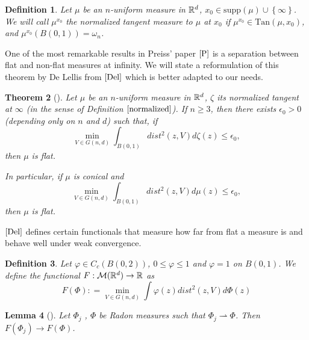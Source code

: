 \documentclass[11pt]{article}
\newtheorem{theorem}{Theorem}[section]
\newtheorem{lemma}[theorem]{Lemma}
\newtheorem{definition}[theorem]{Definition}
\theoremstyle{definition}
\theoremstyle{remark}
\numberwithin{equation}{section}
\begin{document}
 
 \begin{definition}\label{normalized} Let $\mu$ be an $n$-uniform measure in $\mathbb{R}^{d}$, $x_0 \in \mbox{supp}(\mu) \cup \left\lbrace \infty \right\rbrace$. We will call $\mu^{x_0}$ the normalized tangent measure to $\mu$ at $x_0$ if $\mu^{x_0} \in \mbox{Tan}(\mu,x_0)$, and $\mu^{x_0}(B(0,1))=\omega_n$.
 \end{definition}
 
One of the most remarkable results in Preiss' paper $\cite{P}$ is a separation between flat and non-flat measures at infinity. We will state a reformulation of this theorem by De Lellis from $\cite{Del}$ which is better adapted to our needs.

\begin{theorem}[\cite{P}]\label{flatnessinfty}
Let $\mu$ be an  $n$-uniform measure in $\mathbb{R}^{d}$, $\zeta$ its normalized tangent at $\infty$  (in the sense of Definition $\eqref{normalized}$). If $n \geq 3$, then there exists $\epsilon_{0}>0$ (depending only on $n$ and $d$) such that, if \begin{equation}
\min_{V \in G(n,d)} \int_{B(0,1)} dist^{2}(z,V) d\zeta(z) \leq \epsilon_{0},
\end{equation}
then $\mu$ is flat.

In particular, if $\mu$ is conical and \begin{equation} \min_{V \in G(n,d)} \int_{B(0,1)} dist^{2}(z,V) d\mu(z) \leq \epsilon_{0},
\end{equation} then $\mu$ is flat.
\end{theorem}

$\cite{Del}$  defines certain functionals that measure how far from flat a measure is and behave well under weak convergence.

\begin{definition} \label{functional}
Let $\varphi \in C_{c}(B(0,2))$, $0 \leq \varphi \leq 1$ and $\varphi=1$ on $B(0,1)$.
We define the functional $F: \mathcal{M}(\mathbb{R}^{d}) \to \mathbb{R}$ as
$$ F(\Phi): = \min_{V \in G(n,d)} \int \varphi(z) {dist}^{2}(z,V)d\Phi(z)$$
\end{definition}


\begin{lemma}[\cite{Del}]\label{contfunctional}
Let $\Phi_{j}$ , $\Phi$ be Radon measures such that $\Phi_{j} \rightharpoonup \Phi$.
Then $F(\Phi_{j}) \to F(\Phi)$. 
\end{lemma}
\end{document}
